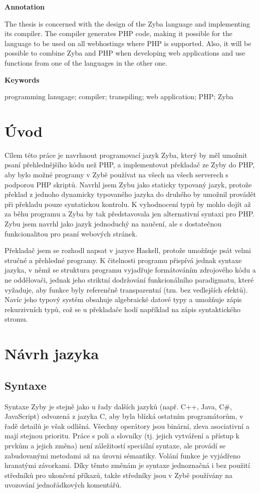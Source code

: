 \documentclass[a4paper,12pt]{article}
\begin{document}
\Large\textbf{Annotation}\normalsize

The thesis is concerned with the design of the Zyba language and implementing its compiler. The compiler generates PHP code, making it possible for the language to be used on all webhostings where PHP is supported. Also, it will be possible to combine Zyba and PHP when developing web applications and use functions from one of the languages in the other one.

\Large\textbf{Keywords}\normalsize

programming lanugage; compiler; transpiling; web application; PHP; Zyba
\newpage
\thispagestyle{empty}
\tableofcontents
\newpage
\section{Úvod}
Cílem této práce je navrhnout programovací jazyk Zyba, který by měl umožnit psaní přehlednějšího kódu než PHP, a implementovat překladač ze Zyby do PHP, aby bylo možné programy v Zybě používat na všech na všech serverech s podporou PHP skriptů. Navrhl jsem Zybu jako staticky typovaný jazyk, protože překlad z jednoho dynamicky typovaného jazyka do druhého by umožnil provádět při překladu pouze syntatickou kontrolu. K vyhodnocení typů by mohlo dojít až za běhu programu a Zyba by tak představovala jen alternativní syntaxi pro PHP. Zybu jsem navrhl jako jazyk jednoduchý na naučení, ale s dostatečnou funkcionalitou pro psaní webových stránek.

Překladač jsem se rozhodl napsat v jazyce Haskell, protože umožňuje psát velmi stručné a přehledné programy. K čitelnosti programu přispívá jednak syntaxe jazyka, v němž se struktura programu vyjadřuje formátováním zdrojového kódu a ne oddělovači, jednak jeho striktní dodržování funkcionálního paradigmatu, které vyžaduje, aby funkce byly referenčně transparentní (tzn. bez vedlejších efektů). Navíc jeho typový systém obsahuje algebraické datové typy a umožňuje zápis rekurzivních typů, což se u překladače hodí například na zápis syntaktického stromu.

\section{Návrh jazyka}
\subsection{Syntaxe}
Syntaxe Zyby je stejně jako u řady dalších jazyků (např. C++, Java, C\#, JavaScript) odvozená z jazyka C, aby byla blízká ostatním programátorům, v řadě detailů je však odlišná. Všechny operátory jsou binární, zleva asociativní a mají stejnou prioritu. Práce s poli a slovníky (tj. jejich vytváření a přístup k prvkům a jejich změna) není záležitostí speciální syntaxe, ale provádí se zabudovanými metodami až na úrovni sémantiky. Volání funkce je vyjádřeno hranatými závorkami. Díky těmto změnám je syntaxe jednoznačná i bez použití středníků pro ukončení příkazů, takže středníky jsou v Zybě používány na uvozování jednořádkových komentářů.
\end{document}

